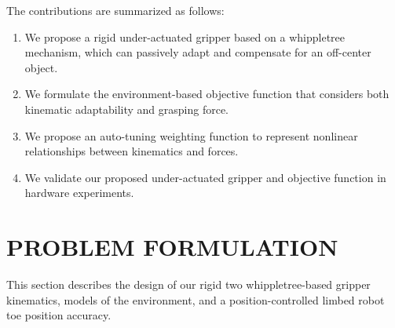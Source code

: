 \documentclass[letterpaper, 10 pt, conference]{ieeeconf}  %
\begin{document}
The contributions are summarized as follows:
\begin{enumerate}
    \item We propose a rigid under-actuated gripper based on a whippletree mechanism, which can passively adapt and compensate for an off-center object.
    \item We formulate the environment-based objective function that considers both kinematic adaptability and grasping force. %
    \item We propose an auto-tuning weighting function to represent nonlinear relationships between kinematics and forces.
    \item We validate our proposed under-actuated gripper and objective function in hardware experiments.
\end{enumerate}



\section{PROBLEM FORMULATION\label{sec:pf}}
This section describes the design of our rigid two whippletree-based gripper kinematics, models of the environment, and a position-controlled limbed robot toe position accuracy.
\end{document}
